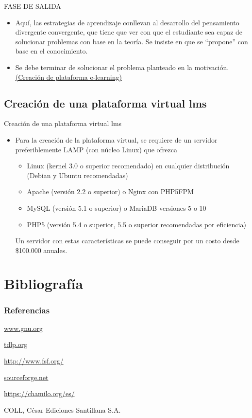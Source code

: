 \documentclass{beamer}
\begin{document}
\begin{frame}{FASE DE SALIDA}
\begin{itemize}
  \item Aquí, las estrategias de aprendizaje conllevan al desarrollo del pensamiento divergente convergente, que tiene que ver con que el estudiante sea capaz de solucionar problemas con base en la teoría. Se insiste en que se ``propone'' con base en el conocimiento.\pause
  \item Se debe terminar de solucionar el problema planteado en la motivación.\href{file:///home/german/Descargas/index.php.html}{(\underline{Creación de plataforma e-learning})}
  \end{itemize}
\end{frame}
\subsection{Creación de una plataforma virtual lms}
\begin{frame}{Creación de una plataforma virtual lms}
\begin{itemize}
\item Para la creación de la plataforma virtual, se requiere de un servidor preferiblemente LAMP (con núcleo Linux) que ofrezca
\begin{itemize}
\item Linux (kernel 3.0 o superior recomendado) en cualquier distribución (Debian y Ubuntu recomendadas)
\item Apache (versión 2.2 o superior) o Nginx con PHP5­FPM
\item MySQL (versión 5.1 o superior) o MariaDB versiones 5 o 10
\item PHP5 (versión 5.4 o superior, 5.5 o superior recomendadas por eficiencia)
\end{itemize}
 Un servidor con estas características se puede conseguir por un costo desde \$100.000 anuales.
\end{itemize}
\end{frame}
\section*{Bibliografía}
\begin{frame}[allowframebreaks]
  \frametitle<presentation>{Referencias}
    
  \begin{thebibliography}{10}
    
    \url{www.gnu.org}

  \url{tdlp.org}
  
  \url{http://www.fsf.org/}
  
  \url{sourceforge.net}
  
\url{https://chamilo.org/es/}  
  
  COLL, César
  \newblock Ediciones Santillana S.A.
  \end{thebibliography}
\end{frame}
\end{document}
